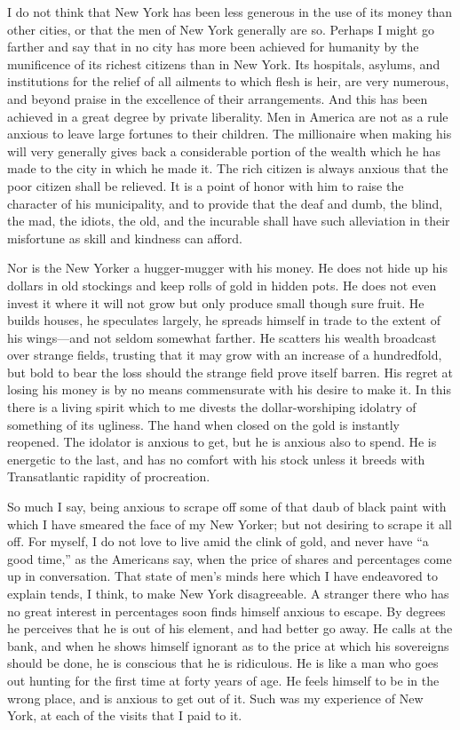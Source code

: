 I do not think that New York has been less generous in the use of
its money than other cities, or that the men of New York generally
are so.  Perhaps I might go farther and say that in no city has
more been achieved for humanity by the munificence of its richest
citizens than in New York.  Its hospitals, asylums, and
institutions for the relief of all ailments to which flesh is heir,
are very numerous, and beyond praise in the excellence of their
arrangements.  And this has been achieved in a great degree by
private liberality.  Men in America are not as a rule anxious to
leave large fortunes to their children.  The millionaire when
making his will very generally gives back a considerable portion of
the wealth which he has made to the city in which he made it.  The
rich citizen is always anxious that the poor citizen shall be
relieved.  It is a point of honor with him to raise the character
of his municipality, and to provide that the deaf and dumb, the
blind, the mad, the idiots, the old, and the incurable shall have
such alleviation in their misfortune as skill and kindness can
afford.

Nor is the New Yorker a hugger-mugger with his money.  He does not
hide up his dollars in old stockings and keep rolls of gold in
hidden pots.  He does not even invest it where it will not grow but
only produce small though sure fruit.  He builds houses, he
speculates largely, he spreads himself in trade to the extent of
his wings---and not seldom somewhat farther.  He scatters his wealth
broadcast over strange fields, trusting that it may grow with an
increase of a hundredfold, but bold to bear the loss should the
strange field prove itself barren.  His regret at losing his money
is by no means commensurate with his desire to make it.  In this
there is a living spirit which to me divests the dollar-worshiping
idolatry of something of its ugliness.  The hand when closed on the
gold is instantly reopened.  The idolator is anxious to get, but he
is anxious also to spend.  He is energetic to the last, and has no
comfort with his stock unless it breeds with Transatlantic rapidity
of procreation.

So much I say, being anxious to scrape off some of that daub of
black paint with which I have smeared the face of my New Yorker;
but not desiring to scrape it all off.  For myself, I do not love
to live amid the clink of gold, and never have ``a good time,'' as
the Americans say, when the price of shares and percentages come up
in conversation.  That state of men's minds here which I have
endeavored to explain tends, I think, to make New York
disagreeable.  A stranger there who has no great interest in
percentages soon finds himself anxious to escape.  By degrees he
perceives that he is out of his element, and had better go away.
He calls at the bank, and when he shows himself ignorant as to the
price at which his sovereigns should be done, he is conscious that
he is ridiculous.  He is like a man who goes out hunting for the
first time at forty years of age.  He feels himself to be in the
wrong place, and is anxious to get out of it.  Such was my
experience of New York, at each of the visits that I paid to it.

